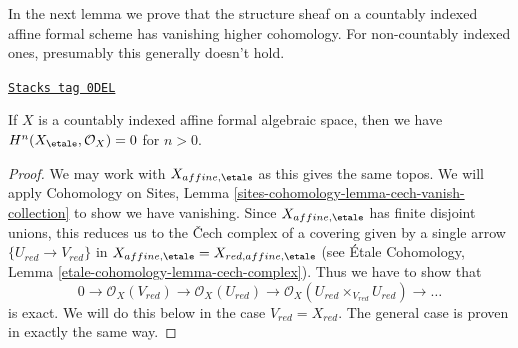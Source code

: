 In the next lemma we prove that the structure sheaf on a countably
indexed affine formal scheme has vanishing higher cohomology.
For non-countably indexed ones, presumably this generally doesn't hold.

\begin{lemma}
\label{formal-spaces-lemma-higher-vanishing-structure-sheaf}
\href{https://stacks.math.columbia.edu/tag/0DEL}{\texttt{Stacks tag 0DEL}}

If $X$ is a countably indexed affine formal algebraic space, then
we have $H^n(X_\etale, \mathcal{O}_X) = 0$ for $n > 0$.
\end{lemma}

\begin{proof}
We may work with $X_{affine, \etale}$ as this gives the same topos.
We will apply Cohomology on Sites, Lemma
\ref{sites-cohomology-lemma-cech-vanish-collection}
to show we have vanishing. Since $X_{affine, \etale}$
has finite disjoint unions, this reduces us to the {\v C}ech
complex of a covering given by a single arrow $\{U_{red} \to V_{red}\}$
in $X_{affine, \etale} = X_{red, affine, \etale}$
(see \'Etale Cohomology, Lemma \ref{etale-cohomology-lemma-cech-complex}).
Thus we have to show that
$$
0 \to \mathcal{O}_X(V_{red}) \to \mathcal{O}_X(U_{red}) \to
\mathcal{O}_X(U_{red} \times_{V_{red}} U_{red}) \to \ldots
$$
is exact. We will do this below in the case $V_{red} = X_{red}$.
The general case is proven in exactly the same way.


\end{proof}
